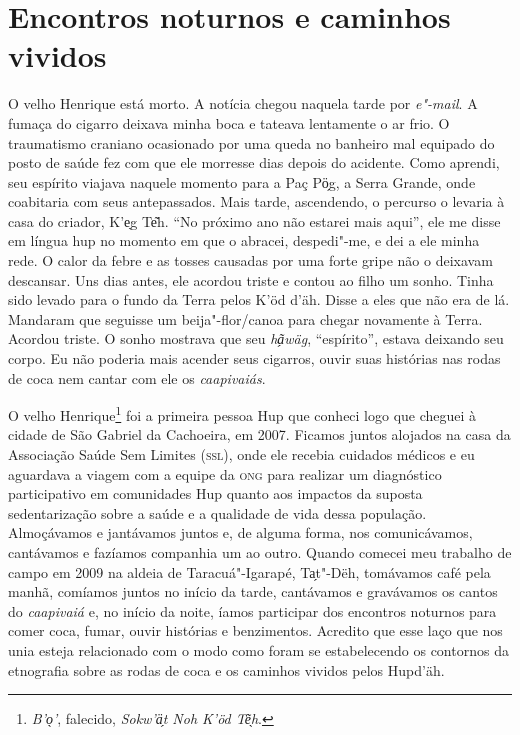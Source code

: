 
\section{Encontros noturnos e caminhos
vividos}\label{encontros-noturnos-e-caminhos-vividos}

O velho Henrique está morto. A notícia chegou naquela tarde por
\textit{e"-mail}. A fumaça do cigarro deixava minha boca e tateava
lentamente o ar frio. O traumatismo craniano ocasionado por uma queda no
banheiro mal equipado do posto de saúde fez com que ele morresse dias
depois do acidente. Como aprendi, seu espírito viajava naquele momento
para a Paç Pö̗g, a Serra Grande, onde coabitaria com seus
antepassados. Mais tarde, ascendendo, o percurso o levaria à casa do
criador, K'e̖g Te͂h. ``No próximo ano não estarei mais aqui'', ele me
disse em língua hup no momento em que o abracei, despedi"-me, e dei a ele
minha rede. O calor da febre e as tosses causadas por uma forte gripe
não o deixavam descansar. Uns dias antes, ele acordou triste e contou ao
filho um sonho. Tinha sido levado para o fundo da Terra pelos K'öd
d'äh. Disse a eles que não era de lá. Mandaram que seguisse um
beija"-flor/canoa para chegar novamente à Terra. Acordou triste. O sonho
mostrava que seu \textit{ha̗͂wäg}, ``espírito'', estava deixando seu corpo. Eu
não poderia mais acender seus cigarros, ouvir suas histórias nas rodas
de coca nem cantar com ele os \textit{caapivaiás}.

O velho Henrique\footnote{\textit{B'o̖'}, falecido, \textit{Sokw'ä̗t Noh K'öd Tẽ̖h}.} foi
a primeira pessoa Hup que conheci logo que cheguei à cidade de São
Gabriel da Cachoeira, em 2007. Ficamos juntos alojados na casa da
Associação Saúde Sem Limites (\textsc{ssl}), onde ele recebia cuidados médicos e
eu aguardava a viagem com a equipe da \textsc{ong} para realizar um diagnóstico
participativo em comunidades Hup quanto aos impactos da suposta
sedentarização sobre a saúde e a qualidade de vida dessa população.
Almoçávamos e jantávamos juntos e, de alguma forma, nos comunicávamos,
cantávamos e fazíamos companhia um ao outro. Quando comecei meu trabalho
de campo em 2009 na aldeia de Taracuá"-Igarapé, Ta̗t"-Dëh, tomávamos café
pela manhã, comíamos juntos no início da tarde, cantávamos e gravávamos
os cantos do \textit{caapivaiá} e, no início da noite, íamos participar dos
encontros noturnos para comer coca, fumar, ouvir histórias e
benzimentos. Acredito que esse laço que nos unia esteja relacionado com
o modo como foram se estabelecendo os contornos da etnografia sobre as
rodas de coca e os caminhos vividos pelos Hupd'äh.

